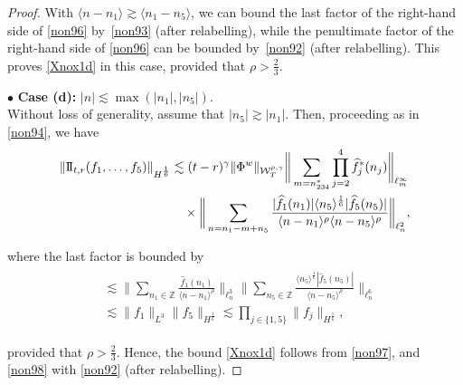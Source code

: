 \documentclass[letterpaper, 11pt,  reqno]{amsart}
\newcommand{\1}{\hspace{0.5mm}\text{I}\hspace{0.5mm}}
\newcommand{\II}{\text{I \hspace{-2.8mm} I} }
\newcommand{\noi}{\noindent}
\newcommand{\Z}{\mathbb{Z}}
\newcommand{\bul}{\bullet}
\newcommand{\g}{\gamma}
\newcommand{\ft}{\widehat}
\renewcommand{\l}{\ell}
\newcommand{\les}{\lesssim}
\newcommand{\ges}{\gtrsim}
\newcommand{\jb}[1]
{\langle #1 \rangle}
\newcommand{\W}{\mathcal{W}}
\numberwithin{equation}{section}
\numberwithin{theorem}{section}
\begin{document}
\begin{proof}
\noi
With $\jb{n-n_1}\ges \jb{n_1 - n_5}$, we can bound the last factor 
of the right-hand side of \eqref{non96}
by~\eqref{non93} (after relabelling), 
while the penultimate factor of the right-hand side of \eqref{non96}
can be bounded by~\eqref{non92} (after relabelling).
This proves \eqref{Xnox1d} in this case, provided that $\rho > \frac 23$.


\medskip


\noi
$\bul$ {\bf Case (d):} $|n|\les \max(|n_1|, |n_5|)$.\\ %
\indent
Without loss of generality, assume that $|n_5|\ges |n_1|$.
Then, 
proceeding as in \eqref{non94},  we have 
\begin{align}
\begin{split}
 \|\II_{t, r}(f_1, \dots, f_5)\|_{H^\frac 16}
&  
\les 
(t - r)^\g
\|\Phi^w\|_{  \W^{\rho,\g}_T} 
\bigg\| \sum_{m = n_{234}^*}
\prod_{j = 2}^4
{\ft f_j}^*(n_j)\bigg\|_{\l^\infty_{m}}\\
& \quad \times \bigg\| 
\sum_{n = n_1-m  + n_5}
\frac {|\ft f_1(n_1)|  \jb{n_5}^\frac 16 |\ft f_5(n_5)|}{\jb{n - n_1}^{\rho}\jb{n - n_5}^{\rho}}
\bigg\|_{\l^2_n}, 
\end{split}
\label{non97}
\end{align}

\noi
where the last factor is bounded by 
\begin{align}
\begin{split}
& \les 
\bigg\|
\sum_{n_1 \in \Z}
\frac{\ft f_1(n_1)}{\jb{n - n_1}^{\rho}}\bigg\|_{\l^3_{n}}
\bigg\|
\sum_{n_5 \in \Z} \frac{  \jb{n_5}^\frac 16 |\ft f_5(n_5)|}{\jb{n - n_5}^{\rho}}\bigg\|_{\l^6_{n}}\\
& \les  \|f_1\|_{L^3}
\|f_5\|_{H^\frac 16}
\les \prod_{j \in \{1, 5\}} \|f_j\|_{H^\frac 16}, 
\end{split}
\label{non98}
\end{align}

\noi
provided that $\rho > \frac 23$.
Hence, the bound \eqref{Xnox1d}
follows from \eqref{non97}, 
and \eqref{non98}
with 
\eqref{non92} (after relabelling).
\end{proof}
\end{document}
